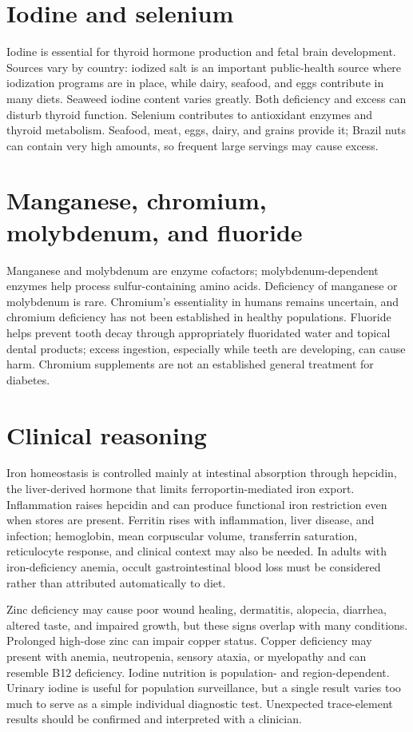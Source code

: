 \section{Iodine and selenium}
Iodine is essential for thyroid hormone production and fetal brain development. Sources vary by country: iodized salt is an important public-health source where iodization programs are in place, while dairy, seafood, and eggs contribute in many diets. Seaweed iodine content varies greatly. Both deficiency and excess can disturb thyroid function. Selenium contributes to antioxidant enzymes and thyroid metabolism. Seafood, meat, eggs, dairy, and grains provide it; Brazil nuts can contain very high amounts, so frequent large servings may cause excess. \cite{odsIodine,odsSelenium}

\section{Manganese, chromium, molybdenum, and fluoride}
Manganese and molybdenum are enzyme cofactors; molybdenum-dependent enzymes help process sulfur-containing amino acids. Deficiency of manganese or molybdenum is rare. Chromium's essentiality in humans remains uncertain, and chromium deficiency has not been established in healthy populations. Fluoride helps prevent tooth decay through appropriately fluoridated water and topical dental products; excess ingestion, especially while teeth are developing, can cause harm. Chromium supplements are not an established general treatment for diabetes. \cite{odsManganese,odsMolybdenum,odsChromium,odsFluoride}


\section{Clinical reasoning}
Iron homeostasis is controlled mainly at intestinal absorption through hepcidin, the liver-derived hormone that limits ferroportin-mediated iron export. Inflammation raises hepcidin and can produce functional iron restriction even when stores are present. Ferritin rises with inflammation, liver disease, and infection; hemoglobin, mean corpuscular volume, transferrin saturation, reticulocyte response, and clinical context may also be needed. In adults with iron-deficiency anemia, occult gastrointestinal blood loss must be considered rather than attributed automatically to diet.

Zinc deficiency may cause poor wound healing, dermatitis, alopecia, diarrhea, altered taste, and impaired growth, but these signs overlap with many conditions. Prolonged high-dose zinc can impair copper status. Copper deficiency may present with anemia, neutropenia, sensory ataxia, or myelopathy and can resemble B12 deficiency. Iodine nutrition is population- and region-dependent. Urinary iodine is useful for population surveillance, but a single result varies too much to serve as a simple individual diagnostic test. Unexpected trace-element results should be confirmed and interpreted with a clinician. \cite{whoUrinaryIodine}
